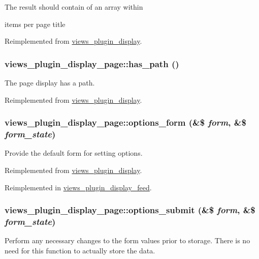 The result should contain of an array within
\begin{DoxyItemize}
\item items per page title 
\end{DoxyItemize}

Reimplemented from \hyperlink{classviews__plugin__display_add6b60160cfdbc8b0ea29a380854057e}{views\_\-plugin\_\-display}.\hypertarget{classviews__plugin__display__page_a6ab3df375279fc7308aea96e3f08f833}{
\subsubsection[{has\_\-path}]{\setlength{\rightskip}{0pt plus 5cm}views\_\-plugin\_\-display\_\-page::has\_\-path ()}}
\label{classviews__plugin__display__page_a6ab3df375279fc7308aea96e3f08f833}
The page display has a path. 

Reimplemented from \hyperlink{classviews__plugin__display_a08fe612e61fe35f549f0ec9a1fe8d953}{views\_\-plugin\_\-display}.\hypertarget{classviews__plugin__display__page_aa8267a4774b92a7b47a3768ac98aac36}{
\subsubsection[{options\_\-form}]{\setlength{\rightskip}{0pt plus 5cm}views\_\-plugin\_\-display\_\-page::options\_\-form (\&\$ {\em form}, \/  \&\$ {\em form\_\-state})}}
\label{classviews__plugin__display__page_aa8267a4774b92a7b47a3768ac98aac36}
Provide the default form for setting options. 

Reimplemented from \hyperlink{classviews__plugin__display_ad9c69d91ea1165ff51dcd1f1f6d3a154}{views\_\-plugin\_\-display}.

Reimplemented in \hyperlink{classviews__plugin__display__feed_abe0a41d577b52de992279986d6c8c2d9}{views\_\-plugin\_\-display\_\-feed}.\hypertarget{classviews__plugin__display__page_a9b03d35a15fcfcae4a474ea56b6ca5b6}{
\subsubsection[{options\_\-submit}]{\setlength{\rightskip}{0pt plus 5cm}views\_\-plugin\_\-display\_\-page::options\_\-submit (\&\$ {\em form}, \/  \&\$ {\em form\_\-state})}}
\label{classviews__plugin__display__page_a9b03d35a15fcfcae4a474ea56b6ca5b6}
Perform any necessary changes to the form values prior to storage. There is no need for this function to actually store the data. 

